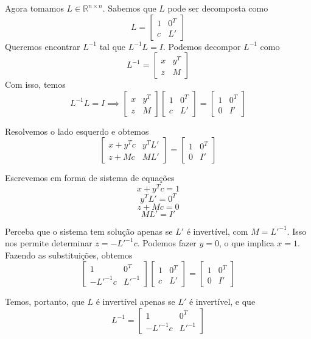 \documentclass[]{article}
\numberwithin{equation}{section}
\begin{document}
Agora tomamos $L \in \mathbb{R}^{n \times n}$. Sabemos que $L$ pode ser decomposta como
$$
L =
\begin{bmatrix}
1 & 0^T \\
c & L'
\end{bmatrix}
$$
Queremos encontrar $L^{-1}$ tal que $L^{-1}L = I$. Podemos decompor $L^{-1}$ como
$$
L^{-1} =
\begin{bmatrix}
x & y^T \\
z & M
\end{bmatrix}
$$
Com isso, temos
$$
L^{-1}L = I \implies
\begin{bmatrix}
x & y^T \\
z & M
\end{bmatrix}
\begin{bmatrix}
1 & 0^T \\
c & L'
\end{bmatrix}
=
\begin{bmatrix}
1 & 0^T \\
0 & I'
\end{bmatrix}
$$

Resolvemos o lado esquerdo e obtemos
$$
\begin{bmatrix}
x + y^Tc & y^TL' \\
z + Mc & ML'
\end{bmatrix}
=
\begin{bmatrix}
1 & 0^T \\
0 & I'
\end{bmatrix}
$$

Escrevemos em forma de sistema de equações
$$
x + y^Tc = 1
$$
$$
y^TL' = 0^T
$$
$$
z + Mc = 0
$$
$$
ML' = I'
$$

Perceba que o sistema tem solução apenas se $L'$ é invertível, com $M = L'^{-1}$. Isso nos permite determinar $z = -L'^{-1}c$. Podemos fazer $y = 0$, o que implica $x = 1$. Fazendo as substituições, obtemos
$$
\begin{bmatrix}
1 & 0^T \\
-L'^{-1}c & L'^{-1}
\end{bmatrix}
\begin{bmatrix}
1 & 0^T \\
c & L'
\end{bmatrix}
=
\begin{bmatrix}
1 & 0^T \\
0 & I'
\end{bmatrix}
$$

Temos, portanto, que $L$ é invertível apenas se $L'$ é invertível, e que
$$
L^{-1} =
\begin{bmatrix}
1 & 0^T \\
-L'^{-1}c & L'^{-1}
\end{bmatrix}
$$
\end{document}
